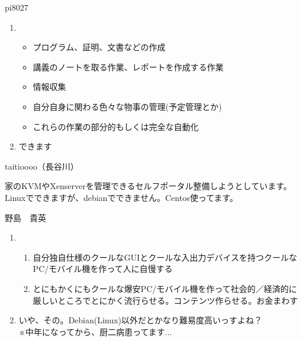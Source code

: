 \begin{prework}{ pi8027 }

\begin{enumerate}
\item \begin{itemize}
\item プログラム、証明、文書などの作成
\item 講義のノートを取る作業、レポートを作成する作業
\item 情報収集
\item 自分自身に関わる色々な物事の管理(予定管理とか)
\item これらの作業の部分的もしくは完全な自動化
\end{itemize}
\item できます
\end{enumerate}

\end{prework}

\begin{prework}{ taitioooo（長谷川） }

家のKVMやXenserverを管理できるセルフポータル整備しようとしています。Linuxでできますが、debianでできません。Centos使ってます。

\end{prework}

\begin{prework}{ 野島　貴英 }

\begin{enumerate}
\item \begin{enumerate}
\item 自分独自仕様のクールなGUIとクールな入出力デバイスを持つクールなPC/モバイル機を作って人に自慢する
\item とにもかくにもクールな爆安PC/モバイル機を作って社会的／経済的に厳しいところでとにかく流行らせる。コンテンツ作らせる。お金まわす
\end{enumerate}
\item いや、その。Debian(Linux)以外だとかなり難易度高いっすよね？\\
※中年になってから、厨二病患ってます...
\end{enumerate}
\end{prework}

